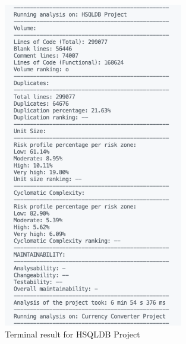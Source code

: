 \documentclass[11pt]{report}
\begin{document}
\begin{appendices}
\begin{figure}[h!]
    \centering
    \includegraphics[width=0.7\textwidth]{images/big_sql.png}
    \caption{Terminal result for HSQLDB Project}
    \label{fig:big-sql}
\end{figure}


\end{appendices}
\end{document}
